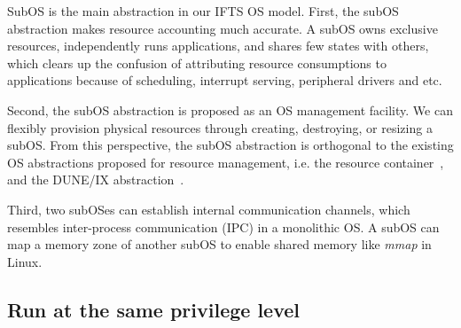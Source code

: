 \documentclass[pageno]{jpaper}
\begin{document}
 SubOS is the main abstraction in our IFTS OS model.
First, the subOS abstraction makes resource accounting much accurate. A subOS owns exclusive resources, independently runs applications, and shares few states with others, which clears up the confusion of attributing resource consumptions to applications because of  scheduling, interrupt serving, peripheral drivers and etc.





Second, the subOS abstraction is proposed as an OS management facility. We can flexibly  provision physical resources through creating, destroying, or resizing a subOS.  From this perspective, the subOS abstraction is orthogonal to the existing OS abstractions proposed for resource management, i.e. the resource container~\cite{banga1999resource}, and the DUNE/IX abstraction~\cite{Belay:2012:DSU:2387880.2387913, belay2014ix}.





















Third, two subOSes can establish internal communication channels, which resembles inter-process communication (IPC) in a monolithic OS. A subOS can map a memory zone of another subOS to enable shared memory like \emph{mmap} in Linux. 




\subsection{Run at the same privilege level}
\end{document}
